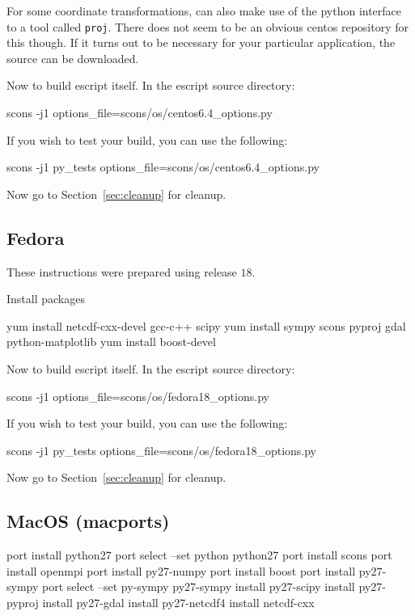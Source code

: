 \noindent For some coordinate transformations, \downunder can also make use of the python interface to a tool called \texttt{proj}.
There does not seem to be an obvious centos repository for this though.
If it turns out to be necessary for your particular application, the source can be downloaded. 

\noindent Now to build escript itself.
In the escript source directory:
\begin{shellCode}
scons -j1 options_file=scons/os/centos6.4_options.py
\end{shellCode}

\noindent If you wish to test your build, you can use the following:
\begin{shellCode}
scons -j1 py_tests options_file=scons/os/centos6.4_options.py 
\end{shellCode}

\noindent Now go to Section~\ref{sec:cleanup} for cleanup.

\subsection{Fedora}\label{sec:fedorasrc}
These instructions were prepared using release $18$.

\noindent Install packages
\begin{shellCode}
yum install netcdf-cxx-devel gcc-c++ scipy 
yum install sympy scons pyproj gdal python-matplotlib 
yum install boost-devel
\end{shellCode}

\noindent Now to build escript itself.
In the escript source directory:
\begin{shellCode}
scons -j1 options_file=scons/os/fedora18_options.py
\end{shellCode}

\noindent If you wish to test your build, you can use the following:
\begin{shellCode}
scons -j1 py_tests options_file=scons/os/fedora18_options.py 
\end{shellCode}

\noindent Now go to Section~\ref{sec:cleanup} for cleanup.

\subsection{MacOS (macports)}\label{sec:macportsrc}

\begin{shellCode}
port install python27
port select --set python python27
port install scons
port install openmpi
port install py27-numpy
port install boost
port install py27-sympy
port select --set py-sympy py27-sympy
install py27-scipy
install py27-pyproj
install py27-gdal
install py27-netcdf4
install netcdf-cxx
\end{shellCode}

